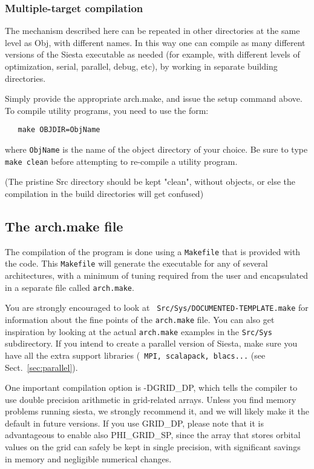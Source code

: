 \documentclass[11pt]{article}
\begin{document}
\subsubsection{Multiple-target compilation}

The mechanism described here can be repeated in other directories at
the same level as Obj, with different names. In this way one can
compile as many different versions of the {\sc Siesta} executable as
needed (for example, with different levels of optimization, serial,
parallel, debug, etc), by working in separate building directories.

Simply provide the appropriate arch.make, and issue the setup command
above. To compile utility programs, you need to use the form:

\begin{verbatim}
   make OBJDIR=ObjName
\end{verbatim}

where {\tt ObjName} is the name of the object directory of your
choice. Be sure to type {\tt make clean} before attempting to
re-compile a utility program.

(The pristine Src directory should be kept "clean", without objects, or else
the compilation in the build directories will get confused)


\subsection{The arch.make file}
\label{sec:arch-make}

The compilation of the program is done using a {\tt Makefile} that is
provided with the code. This {\tt Makefile} will
generate the executable for any of several architectures, with a
minimum of tuning required from the user and encapsulated in a
separate file called {\tt arch.make}.

You are strongly encouraged to look at {\tt
  Src/Sys/DOCUMENTED-TEMPLATE.make} for information about the fine
points of the {\tt arch.make} file. You can also get inspiration by
looking at the actual {\tt arch.make} examples in the {\tt Src/Sys}
subdirectory. If you intend to create a parallel version of {\sc
  Siesta}, make sure you have all the extra support libraries ({\tt
  MPI, scalapack, blacs...} (see Sect.~\ref{sec:parallel}).
  
One important compilation option is -DGRID\_DP, which tells the
compiler to use double precision arithmetic in grid-related arrays.
Unless you find memory problems running siesta, we strongly 
recommend it, and we will likely make it the default in future
versions. If you use GRID\_DP, please note that it is advantageous
to enable also PHI\_GRID\_SP, since the array that stores orbital
values on the grid can safely be kept in single precision, with significant
savings in memory and negligible numerical changes.
\end{document}
